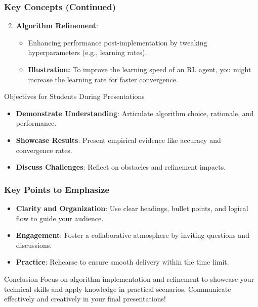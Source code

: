 \documentclass[aspectratio=169]{beamer}
\begin{document}
\begin{frame}[fragile]
    \frametitle{Key Concepts (Continued)}
    \begin{enumerate}
        \setcounter{enumi}{1} %
        \item \textbf{Algorithm Refinement}:
        \begin{itemize}
            \item Enhancing performance post-implementation by tweaking hyperparameters (e.g., learning rates).
            \item \textbf{Illustration:} To improve the learning speed of an RL agent, you might increase the learning rate for faster convergence.
        \end{itemize}
    \end{enumerate}

    \begin{block}{Objectives for Students During Presentations}
        \begin{itemize}
            \item \textbf{Demonstrate Understanding}: Articulate algorithm choice, rationale, and performance.
            \item \textbf{Showcase Results}: Present empirical evidence like accuracy and convergence rates.
            \item \textbf{Discuss Challenges}: Reflect on obstacles and refinement impacts.
        \end{itemize}
    \end{block}
\end{frame}

\begin{frame}[fragile]
    \frametitle{Key Points to Emphasize}
    \begin{itemize}
        \item \textbf{Clarity and Organization}: Use clear headings, bullet points, and logical flow to guide your audience.
        \item \textbf{Engagement}: Foster a collaborative atmosphere by inviting questions and discussions.
        \item \textbf{Practice}: Rehearse to ensure smooth delivery within the time limit.
    \end{itemize}

    \begin{block}{Conclusion}
        Focus on algorithm implementation and refinement to showcase your technical skills and apply knowledge in practical scenarios. Communicate effectively and creatively in your final presentations!
    \end{block}
\end{frame}
\end{document}
